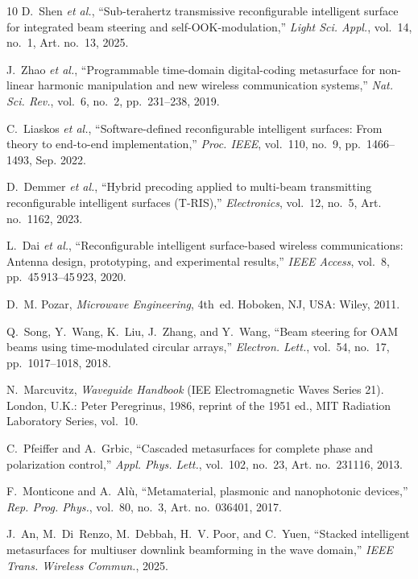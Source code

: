 \documentclass[journal]{IEEEtran}
\begin{document}
\begin{thebibliography}{10}
D.~Shen \emph{et al.}, ``Sub-terahertz transmissive reconfigurable intelligent surface for integrated beam steering and self-OOK-modulation,'' \emph{Light Sci. Appl.}, vol.~14, no.~1, Art. no.~13, 2025.

J.~Zhao \emph{et al.}, ``Programmable time-domain digital-coding metasurface for non-linear harmonic manipulation and new wireless communication systems,'' \emph{Nat. Sci. Rev.}, vol.~6, no.~2, pp.~231--238, 2019.

C.~Liaskos \emph{et al.}, ``Software-defined reconfigurable intelligent surfaces: From theory to end-to-end implementation,'' \emph{Proc. IEEE}, vol.~110, no.~9, pp.~1466--1493, Sep. 2022.

D.~Demmer \emph{et al.}, ``Hybrid precoding applied to multi-beam transmitting reconfigurable intelligent surfaces (T-RIS),'' \emph{Electronics}, vol.~12, no.~5, Art. no.~1162, 2023.

L.~Dai \emph{et al.}, ``Reconfigurable intelligent surface-based wireless communications: Antenna design, prototyping, and experimental results,'' \emph{IEEE Access}, vol.~8, pp.~45\,913--45\,923, 2020.

D.~M. Pozar, \emph{Microwave Engineering}, 4th~ed. Hoboken, NJ, USA: Wiley, 2011.

Q.~Song, Y.~Wang, K.~Liu, J.~Zhang, and Y.~Wang, ``Beam steering for OAM beams using time-modulated circular arrays,'' \emph{Electron. Lett.}, vol.~54, no.~17, pp.~1017--1018, 2018.

N.~Marcuvitz, \emph{Waveguide Handbook} (IEE Electromagnetic Waves Series 21). London, U.K.: Peter Peregrinus, 1986, reprint of the 1951 ed., MIT Radiation Laboratory Series, vol.~10.

C.~Pfeiffer and A.~Grbic, ``Cascaded metasurfaces for complete phase and polarization control,'' \emph{Appl. Phys. Lett.}, vol.~102, no.~23, Art. no.~231116, 2013.

F.~Monticone and A.~Al\`u, ``Metamaterial, plasmonic and nanophotonic devices,'' \emph{Rep. Prog. Phys.}, vol.~80, no.~3, Art. no.~036401, 2017.

J.~An, M.~Di~Renzo, M.~Debbah, H.~V. Poor, and C.~Yuen, ``Stacked intelligent metasurfaces for multiuser downlink beamforming in the wave domain,'' \emph{IEEE Trans. Wireless Commun.}, 2025.


\end{thebibliography}
\end{document}
